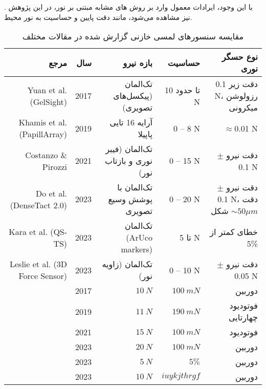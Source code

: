  \cite{costanzo2021optical}.
 با این وجود، ایرادات معمول وارد بر روش های مشابه مبتنی بر نور، در این پژوهش نیز مشاهده می‌شود، مانند دقت پایین و حساسیت به نور محیط.
 \begin{table}[ht]
 	\centering
 	\caption{مقایسه سنسورهای لمسی خازنی گزارش ‌شده در مقالات مختلف}
 	\label{tab:cap}
 	\onehalfspacing
 	\begin{tabular}{|r|r|r|r|r|}
 		\hline
 		\textbf{مرجع} & \textbf{سال}  & \textbf{بازه نیرو} & \textbf{حساسیت} & \textbf{نوع حسگر نوری} \\ \hline \hline
 		Yuan et al. (GelSight) \cite{yuan_gelsight_2017} & 2017 & تک‌المان (پیکسل‌های تصویری) & تا حدود 10 N & دقت زیر 0.1 N، رزولوشن میکرونی \\ \hline
 		Khamis et al. (PapillArray) \cite{khamis_novel_2019} & 2019 & آرایه 16 تایی پاپیلا & 0 -- 8 N & $\approx$0.01 N \\ \hline
 		Costanzo \& Pirozzi \cite{costanzo_optical_2021} & 2021 & تک‌المان (فیبر نوری و بازتاب نور) & 0 -- 15 N & دقت نیرو $\pm$0.1 N \\ \hline
 		Do et al. (DenseTact 2.0) \cite{do_densetact_2023} & 2023 & تک‌المان با پوشش وسیع تصویری & 0 -- 20 N & دقت نیرو $\pm$0.1 N، دقت شکل $\sim 50 \mu m$ \\ \hline
 		Kara et al. (QS-TS) \cite{kara_towards_2023} & 2023 & تک‌المان (ArUco markers) & تا 5 N & خطای کمتر از 5\% \\ \hline
 		Leslie et al. (3D Force Sensor) \cite{leslie_tactile_2023} & 2023 & تک‌المان (زاویه نور) & 0 -- 10 N & دقت نیرو $\pm$0.05 N \\ \hline
 		\cite{yuan2017gelsight} 
 		& 2017 
 		& $10 \: N$
 		& $100 \: mN$
 		&دوربین\\
 		\hline
 		
 		\cite{khamis_novel_2019} 
 		& 2019
 		& $11 \: N$
 		& $190 \: mN$
 		&فوتودیود چهارتایی\\
 		\hline
 		
 		\cite{costanzo2021optical} 
 		& 2021
 		& $15 \: N$
 		& $100 \: mN$
 		&فوتودیود \\
 		\hline
 		
 		\cite{do2022densetact} 
 		& 2023
 		& $20 \: N$
 		& $100 \: mN$
 		&دوربین\\
 		\hline
 		
 		\cite{kara2023towards} 
 		& 2023
 		& $5 \: N$
 		& $5 \%$
 		&دوربین\\
 		\hline
 		
 		\cite{leslie2023tactile} 
 		& 2023
 		& $10 \: N$
 		& $iuykjthrgf$
 		&دوربین\\
 		\hline
 	\end{tabular}
 \end{table}
